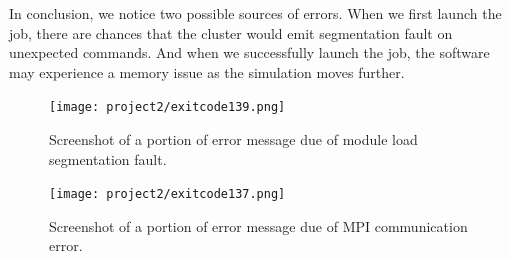 \documentclass[11pt]{article} %
\begin{document}
In conclusion, we notice two possible sources of errors. When we first launch the job, there are chances that the cluster would emit segmentation fault on unexpected commands. And when we successfully launch the job, the software may experience a memory issue as the simulation moves further. 

\begin{figure}[H]
    \centering
    \texttt{[image: project2/exitcode139.png]}
    \caption{Screenshot of a portion of error message due of module load segmentation fault.}
    \label{fig:my_label}
\end{figure}
\begin{figure}[H]
    \centering
    \texttt{[image: project2/exitcode137.png]}
    \caption{Screenshot of a portion of error message due of MPI communication error.}
    \label{fig:my_label}
\end{figure}
\end{document}
